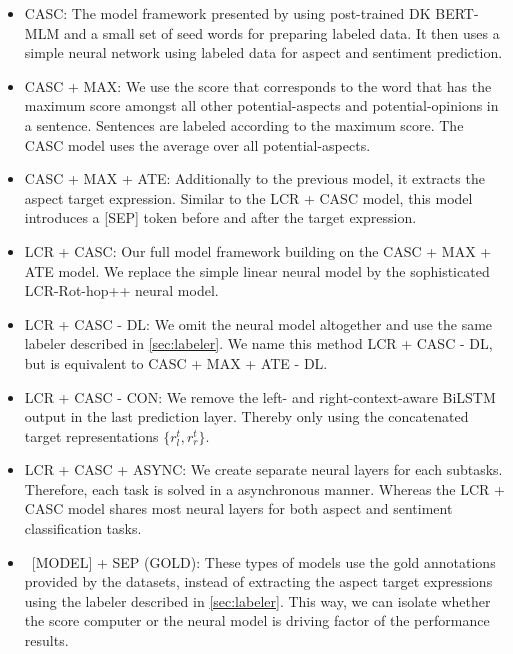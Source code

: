 \documentclass[american, oneside]{ecsgdp}
\begin{document}
\begin{itemize}
    \item CASC: The model framework presented by \textcite{Kumar2021CASC} using post-trained DK BERT-MLM and a small set of seed words for preparing labeled data. It then uses a simple neural network using labeled data for aspect and sentiment prediction.
    \item CASC + MAX: We use the score that corresponds to the word that has the maximum score amongst all other potential-aspects and potential-opinions in a sentence. Sentences are labeled according to the maximum score. The CASC model uses the average over all potential-aspects.
    \item CASC + MAX + ATE: Additionally to the previous model, it extracts the aspect target expression. Similar to the LCR + CASC model, this model introduces a [SEP] token before and after the target expression.
    \item LCR + CASC: Our full model framework building on the CASC + MAX + ATE model. We replace the simple linear neural model by the sophisticated LCR-Rot-hop++ neural model.
    \item LCR + CASC - DL: We omit the neural model altogether and use the same labeler described in \cref{sec:labeler}. We name this method LCR + CASC - DL, but is equivalent to CASC + MAX + ATE - DL.
    \item LCR + CASC - CON: We remove the left- and right-context-aware BiLSTM output in the last prediction layer. Thereby only using the concatenated target representations $\{r^t_l, r^t_r\}$.
    \item LCR + CASC + ASYNC: We create separate neural layers for each subtasks. Therefore, each task is solved in a asynchronous manner. Whereas the LCR + CASC model shares most neural layers for both aspect and sentiment classification tasks.
    \item \ [MODEL] + SEP (GOLD): These types of models use the gold annotations provided by the datasets, instead of extracting the aspect target expressions using the labeler described in \cref{sec:labeler}. This way, we can isolate whether the score computer or the neural model is driving factor of the performance results.
\end{itemize}


\end{document}
